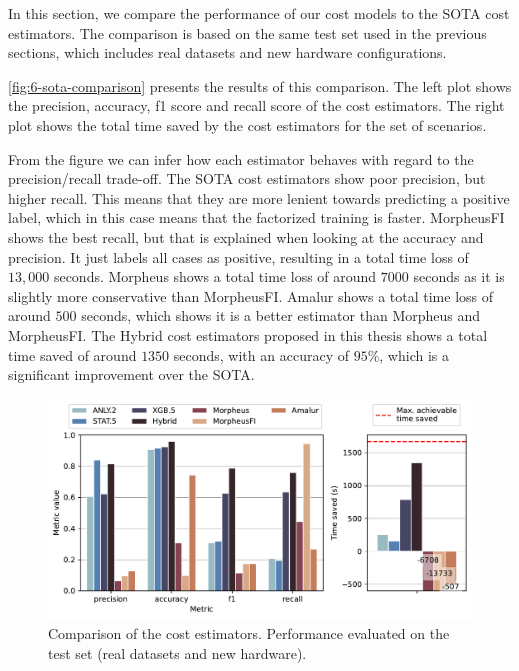 In this section, we compare the performance of our cost models to the SOTA cost estimators. The comparison is based on the same test set used in the previous sections, which includes real datasets and new hardware configurations.

\autoref{fig:6-sota-comparison} presents the results of this comparison. The left plot shows the precision, accuracy, f1 score and recall score of the cost estimators. The right plot shows the total time saved by the cost estimators for the set of scenarios.

From the figure we can infer how each estimator behaves with regard to the precision/recall trade-off. The SOTA cost estimators show poor precision, but higher recall. This means that they are more lenient towards predicting a positive label, which in this case means that the factorized training is faster. MorpheusFI \cite{MorpheusFI} shows the best recall, but that is explained when looking at the accuracy and precision. It just labels all cases as positive, resulting in a total time loss of $13,000$ seconds. Morpheus \cite{orion_learning_gen_lin_models} shows a total time loss of around $7000$ seconds as it is slightly more conservative than MorpheusFI. Amalur \cite{amalur} shows a total time loss of around $500$ seconds, which shows it is a better estimator than Morpheus and MorpheusFI. The Hybrid cost estimators proposed in this thesis shows a total time saved of around $1350$ seconds, with an accuracy of $95\%$, which is a significant improvement over the SOTA.

\begin{figure}[ht]
  \centering
  \includegraphics[width=\linewidth]{chapters/06_evaluation/figures/eval_sota_results.pdf}
  \caption{Comparison of the cost estimators. Performance evaluated on the test set (real datasets and new hardware).}
  \label{fig:6-sota-comparison}
\end{figure}

